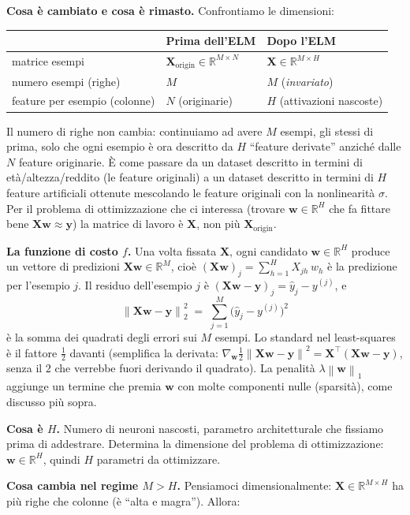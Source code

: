 \documentclass[11pt,a4paper]{article}
\newcommand{\R}{\mathbb{R}}
\newcommand{\norm}[1]{\left\|#1\right\|}
\newcommand{\bw}{\mathbf{w}}
\newcommand{\by}{\mathbf{y}}
\newcommand{\bX}{\mathbf{X}}
\theoremstyle{definition}
\begin{document}
\smallskip
\textbf{Cosa è cambiato e cosa è rimasto.} Confrontiamo le dimensioni:
\begin{center}
\begin{tabular}{lll}
\hline
& \textbf{Prima dell'ELM} & \textbf{Dopo l'ELM} \\
\hline
matrice esempi & $\bX_{\text{origin}}\in\R^{M\times N}$ & $\bX\in\R^{M\times H}$ \\
numero esempi (righe) & $M$ & $M$ (\emph{invariato}) \\
feature per esempio (colonne) & $N$ (originarie) & $H$ (attivazioni nascoste) \\
\hline
\end{tabular}
\end{center}
Il numero di righe non cambia: continuiamo ad avere $M$ esempi, gli stessi di prima, solo che ogni esempio è ora descritto da $H$ ``feature derivate'' anziché dalle $N$ feature originarie. È come passare da un dataset descritto in termini di età/altezza/reddito (le feature originali) a un dataset descritto in termini di $H$ feature artificiali ottenute mescolando le feature originali con la nonlinearità $\sigma$. Per il problema di ottimizzazione che ci interessa (trovare $\bw\in\R^H$ che fa fittare bene $\bX\bw\approx\by$) la matrice di lavoro è $\bX$, non più $\bX_{\text{origin}}$.

\smallskip
\textbf{La funzione di costo $f$.} Una volta fissata $\bX$, ogni candidato $\bw\in\R^H$ produce un vettore di predizioni $\bX\bw\in\R^M$, cioè $(\bX\bw)_j = \sum_{h=1}^H X_{jh}\,w_h$ è la predizione per l'esempio $j$. Il residuo dell'esempio $j$ è $(\bX\bw-\by)_j = \hat y_j - y^{(j)}$, e
\[
\norm{\bX\bw-\by}_2^2 \;=\; \sum_{j=1}^M \bigl(\hat y_j - y^{(j)}\bigr)^2
\]
è la somma dei quadrati degli errori sui $M$ esempi. Lo standard nel least-squares è il fattore $\tfrac{1}{2}$ davanti (semplifica la derivata: $\nabla_{\bw}\tfrac{1}{2}\norm{\bX\bw-\by}^2 = \bX^\top(\bX\bw-\by)$, senza il $2$ che verrebbe fuori derivando il quadrato). La penalità $\lambda\norm{\bw}_1$ aggiunge un termine che premia $\bw$ con molte componenti nulle (sparsità), come discusso più sopra.

\textbf{Cosa è $H$.} Numero di neuroni nascosti, parametro architetturale che fissiamo prima di addestrare. Determina la dimensione del problema di ottimizzazione: $\bw\in\R^H$, quindi $H$ parametri da ottimizzare.

\textbf{Cosa cambia nel regime $M>H$.} Pensiamoci dimensionalmente: $\bX\in\R^{M\times H}$ ha più righe che colonne (è ``alta e magra''). Allora:
\end{document}
